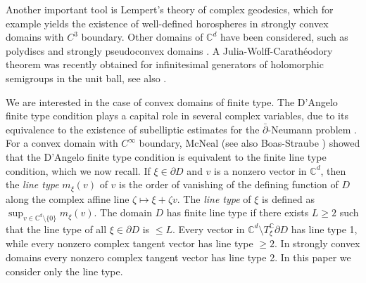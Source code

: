 \documentclass[11pt, reqno]{amsart}
\numberwithin{equation}{section}
\theoremstyle{definition}
\newcommand{\C}{\mathbb{C}}
\begin{document}
	
	Another important tool is Lempert's theory of complex geodesics, which for example yields the existence of well-defined horospheres in strongly convex domains with $C^3$ boundary.
	Other domains of $\C^d$ have been considered, such as polydiscs \cite{Abatepoly} and strongly pseudoconvex domains \cite{AbateSymp,BST}. A Julia-Wolff-Carath\'eodory  theorem was recently obtained  \cite{BrSho,AbateRaissy} for infinitesimal generators of holomorphic semigroups in the unit ball, see also \cite{Raissy}. 
	
	We are interested in the case of convex domains of finite type. 
	The D'Angelo finite type condition \cite{DAngelopaper} plays a capital role in several complex variables, due to its equivalence to the existence of subelliptic estimates for the $\bar{\partial}$-Neumann problem \cite{Kohn, Diederich-Fornaess, Catlin}.
	For a  convex domain with $C^\infty$ boundary, McNeal \cite{mcneal} (see also Boas-Straube \cite{BS}) showed that the D'Angelo finite type condition is equivalent to the finite line type condition, which we now recall.
	If $\xi\in \partial D$ and $v$ is a nonzero vector in $\C^d$, then the {\sl line type} $m_\xi(v)$ of $v$ is the order of vanishing of the defining function of $D$ along the complex affine line $\zeta\mapsto\xi+\zeta v$.
	The {\sl line type} of $\xi$ is defined as $\sup_{v\in \C^d\setminus\{0\}}m_\xi(v)$. 
	The domain $ D$ has finite line type if  there exists $L\geq 2$ such that the line type of  all $\xi\in\partial D$ is  $\leq L$.
	Every vector in $\C^d\setminus T^\C_\xi\partial D$ has line type 1, while every nonzero complex tangent vector   has line type $\geq 2$.
	In strongly convex domains every nonzero complex tangent vector has line type 2. In this paper we consider only the line type.
	
\end{document}
